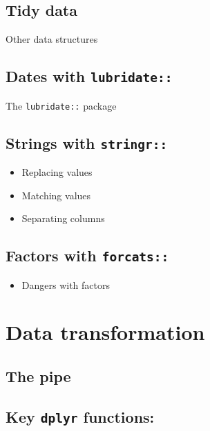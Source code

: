 \documentclass[]{book}
\providecommand{\tightlist}{%
  \setlength{\itemsep}{0pt}\setlength{\parskip}{0pt}}
\begin{document}
\hypertarget{tidy-data}{%
\section{Tidy data}\label{tidy-data}}

Other data structures

\hypertarget{dates-with-lubridate}{%
\section{\texorpdfstring{Dates with \texttt{lubridate::}}{Dates with lubridate::}}\label{dates-with-lubridate}}

The \texttt{lubridate::} package

\hypertarget{strings-with-stringr}{%
\section{\texorpdfstring{Strings with \texttt{stringr::}}{Strings with stringr::}}\label{strings-with-stringr}}

\begin{itemize}
\tightlist
\item
  Replacing values
\item
  Matching values
\item
  Separating columns
\end{itemize}

\hypertarget{factors-with-forcats}{%
\section{\texorpdfstring{Factors with \texttt{forcats::}}{Factors with forcats::}}\label{factors-with-forcats}}

\begin{itemize}
\tightlist
\item
  Dangers with factors
\end{itemize}

\hypertarget{data-transformation}{%
\chapter{Data transformation}\label{data-transformation}}

\hypertarget{the-pipe}{%
\section{The pipe}\label{the-pipe}}

\hypertarget{key-dplyr-functions}{%
\section{\texorpdfstring{Key \texttt{dplyr} functions:}{Key dplyr functions:}}\label{key-dplyr-functions}}
\end{document}
